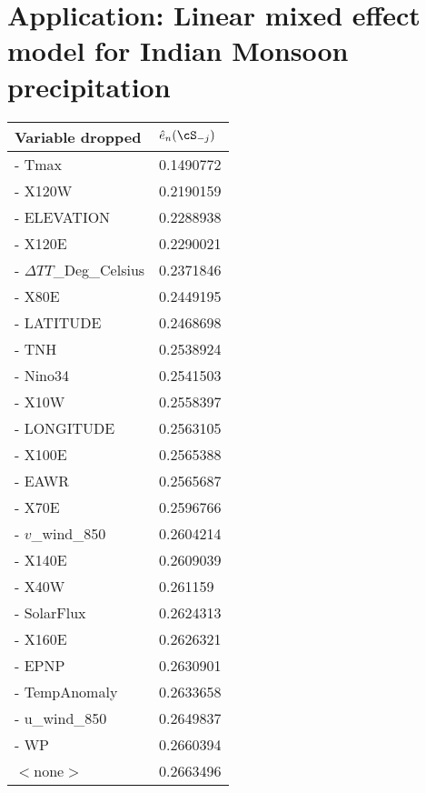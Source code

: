 \section{Application: Linear mixed effect model for Indian Monsoon precipitation}
\label{Section:IndianMonsoon}

\begin{table}
\centering
\begin{scriptsize}
   \begin{tabular}{l|l}
    \hline
      Variable dropped      & $\hat e_n (\cS_{-j})$        \\ \hline
    - Tmax                  & 0.1490772 \\
    - X120W                 & 0.2190159 \\
    - ELEVATION             & 0.2288938 \\
    - X120E                 & 0.2290021 \\
    - $\Delta TT$\_Deg\_Celsius & 0.2371846 \\
    - X80E                  & 0.2449195 \\
    - LATITUDE              & 0.2468698 \\
    - TNH                   & 0.2538924 \\
    - Nino34                & 0.2541503 \\
    - X10W                  & 0.2558397 \\
    - LONGITUDE             & 0.2563105 \\
    - X100E                 & 0.2565388 \\
    - EAWR                  & 0.2565687 \\
    - X70E                  & 0.2596766 \\
    - $v$\_wind\_850          & 0.2604214 \\
    - X140E                 & 0.2609039 \\
    - X40W                  & 0.261159  \\
    - SolarFlux             & 0.2624313 \\
    - X160E                 & 0.2626321 \\
    - EPNP                  & 0.2630901 \\
    - TempAnomaly           & 0.2633658 \\
    - u\_wind\_850          & 0.2649837 \\
    - WP                    & 0.2660394 \\ \hline
    $<$none$>$                  & 0.2663496 \\ \hline

\end{tabular}
\end{scriptsize}
\end{table}
